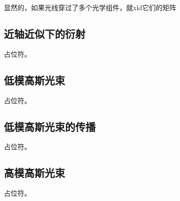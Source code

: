 显然的，如果光线穿过了多个光学组件，就xld它们的矩阵

\subsection{近轴近似下的衍射}
占位符。

\subsection{低模高斯光束}
占位符。

\subsection{低模高斯光束的传播}
占位符。

\subsection{高模高斯光束}
占位符。